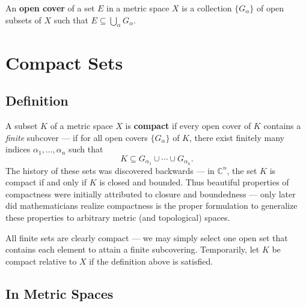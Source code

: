 \documentclass[11pt]{article}
\begin{document}
An \textbf{open cover} of a set $E$ in a metric space $X$ is a collection $\{ G_{\alpha} \}$ of open subsets of $X$ such that $E \subseteq \bigcup_{\alpha} G_{\alpha}$.


\section{Compact Sets}


\subsection{Definition}

A subset $K$ of a metric space $X$ is \textbf{compact} if every open cover of $K$ contains a \textit{finite} subcover --- if for all open covers $\{ G_{\alpha} \}$ of $K$, there exist finitely many indices $\alpha_{1}, \ldots, \alpha_{n}$ such that
\[
	K \subseteq G_{\alpha_{1}} \cup \cdots \cup G_{\alpha_{n}}.
\]
The history of these sets was discovered backwards --- in $\mathbb{C}^{n}$, the set $K$ is compact if and only if $K$ is closed and bounded. Thus beautiful properties of compactness were initially attributed to closure and boundedness --- only later did mathematicians realize compactness is the proper formulation to generalize these properties to arbitrary metric (and topological) spaces.

All finite sets are clearly compact --- we may simply select one open set that contains each element to attain a finite subcovering. Temporarily, let $K$ be compact relative to $X$ if the definition above is satisfied.

\newpage

\subsection{In Metric Spaces}
\end{document}
